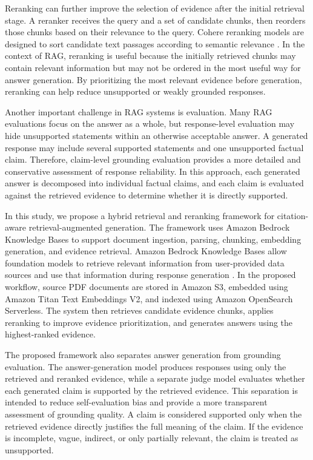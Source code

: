 Reranking can further improve the selection of evidence after the initial retrieval stage. A reranker receives the query and a set of candidate chunks, then reorders those chunks based on their relevance to the query. Cohere reranking models are designed to sort candidate text passages according to semantic relevance \cite{coherererank}. In the context of RAG, reranking is useful because the initially retrieved chunks may contain relevant information but may not be ordered in the most useful way for answer generation. By prioritizing the most relevant evidence before generation, reranking can help reduce unsupported or weakly grounded responses.

Another important challenge in RAG systems is evaluation. Many RAG evaluations focus on the answer as a whole, but response-level evaluation may hide unsupported statements within an otherwise acceptable answer. A generated response may include several supported statements and one unsupported factual claim. Therefore, claim-level grounding evaluation provides a more detailed and conservative assessment of response reliability. In this approach, each generated answer is decomposed into individual factual claims, and each claim is evaluated against the retrieved evidence to determine whether it is directly supported.

In this study, we propose a hybrid retrieval and reranking framework for citation-aware retrieval-augmented generation. The framework uses Amazon Bedrock Knowledge Bases to support document ingestion, parsing, chunking, embedding generation, and evidence retrieval. Amazon Bedrock Knowledge Bases allow foundation models to retrieve relevant information from user-provided data sources and use that information during response generation \cite{awsbedrockkb}. In the proposed workflow, source PDF documents are stored in Amazon S3, embedded using Amazon Titan Text Embeddings V2, and indexed using Amazon OpenSearch Serverless. The system then retrieves candidate evidence chunks, applies reranking to improve evidence prioritization, and generates answers using the highest-ranked evidence.

The proposed framework also separates answer generation from grounding evaluation. The answer-generation model produces responses using only the retrieved and reranked evidence, while a separate judge model evaluates whether each generated claim is supported by the retrieved evidence. This separation is intended to reduce self-evaluation bias and provide a more transparent assessment of grounding quality. A claim is considered supported only when the retrieved evidence directly justifies the full meaning of the claim. If the evidence is incomplete, vague, indirect, or only partially relevant, the claim is treated as unsupported.


